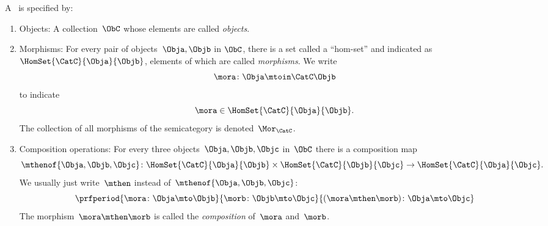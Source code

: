 \begin{ctdefinition}[Semicategory]
    \label{def:semicategory-compact}
    A \emph{}~\CatC is specified by:
    \begin{body}
        \constit
        \begin{enumerate}
            \item Objects: A collection\footnotemark~$\ObC$ whose elements are called \emph{objects}.
            \item Morphisms: For every pair of objects~$\Obja,\Objb$ in $\ObC$, there is a set called a ``hom-set'' and indicated as~$\HomSet{\CatC}{\Obja}{\Objb}$, elements of which are called \emph{morphisms}.
                  We write
                  \begin{equation*}
                      \mora \colon \Obja \mtoin\CatC \Objb
                  \end{equation*}
                  to indicate
                  \begin{equation*}
                      \mora \in \HomSet{\CatC}{\Obja}{\Objb}.
                  \end{equation*}
                  The collection of all morphisms of the semicategory is denoted~$\Mor_\CatC$.
            \item Composition operations: For every three objects~$\Obja,\Objb,\Objc$ in~$\ObC$ there is a composition map
                  \begin{equation*}
                      \mthenof{\Obja,\Objb,\Objc}\colon \HomSet{\CatC}{\Obja}{\Objb} \times \HomSet{\CatC}{\Objb}{\Objc}\to \HomSet{\CatC}{\Obja}{\Objc}.
                  \end{equation*}
                  We usually just write~$\mthen$ instead of~$\mthenof{\Obja,\Objb,\Objc}$:
                  \begin{equation*}
                      \prfperiod{
                          \mora \colon \Obja \mto \Objb
                      }{
                          \morb\colon \Objb \mto \Objc
                      }{
                          (\mora \mthen \morb )\colon \Obja \mto \Objc
                      }
                  \end{equation*}
                  The morphism~$\mora \mthen \morb$ is called the \emph{composition} of~$\mora$ and~$\morb$.

\end{enumerate}
\end{body}
\end{ctdefinition}
